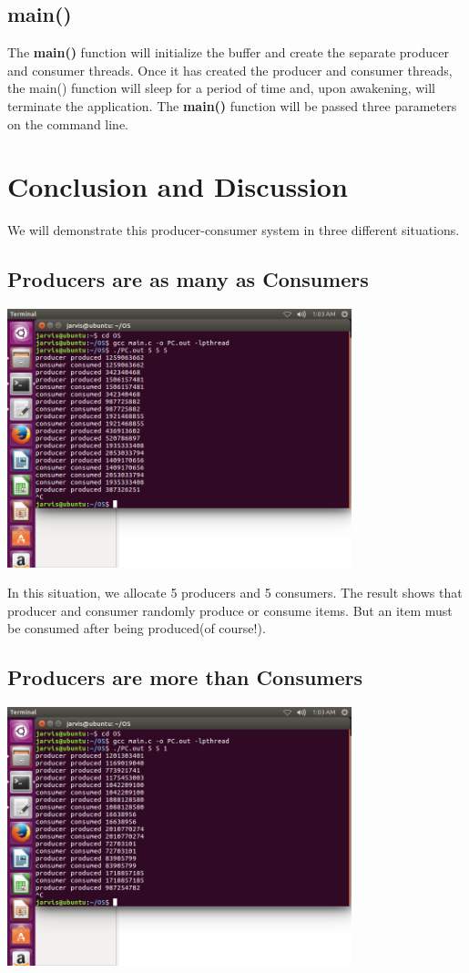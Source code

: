 \documentclass[a4paper, 11pt]{article}
\begin{document}
\subsection{main()}
The \textbf{main()} function will initialize the buffer and create the separate producer and consumer threads. Once it has created the producer and consumer threads, the main() function will sleep for a  period of time and, upon awakening, will terminate the application. The \textbf{main()} function will be passed three parameters on the command line.
\section{Conclusion and Discussion}
We will demonstrate this producer-consumer system in three different situations.
\subsection{Producers are as many as Consumers}
\includegraphics[width=10cm]{pic/555.png}

In this situation, we allocate 5 producers and 5 consumers. The result shows that producer and consumer randomly produce or consume items. But an item must be consumed after being produced(of course!).
\subsection{Producers are more than Consumers}
\includegraphics[width=10cm]{pic/551.png}
\end{document}
